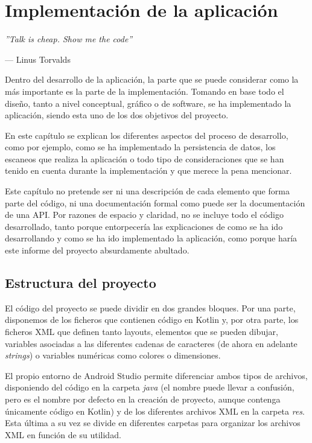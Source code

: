 \chapter{Implementación de la aplicación}

\epigraph{\textit{''Talk is cheap. Show me the code''}}{--- Linus Torvalds}

Dentro del desarrollo de la aplicación, la parte que se puede considerar como la más importante es la parte de la implementación. Tomando en base todo el diseño, tanto a nivel conceptual, gráfico o de software, se ha implementado la aplicación, siendo esta uno de los dos objetivos del proyecto.

En este capítulo se explican los diferentes aspectos del proceso de desarrollo, como por ejemplo, como se ha implementado la persistencia de datos, los escaneos que realiza la aplicación o todo tipo de consideraciones que se han tenido en cuenta durante la implementación y que merece la pena mencionar.

Este capítulo no pretende ser ni una descripción de cada elemento que forma parte del código, ni una documentación formal como puede ser la documentación de una API. Por razones de espacio y claridad, no se incluye todo el código desarrollado, tanto porque entorpecería las explicaciones de como se ha ido desarrollando y como se ha ido implementado la aplicación, como porque haría este informe del proyecto absurdamente abultado.

\section{Estructura del proyecto}
El código del proyecto se puede dividir en dos grandes bloques. Por una parte, disponemos de los ficheros que contienen código en Kotlin y, por otra parte, los ficheros XML que definen tanto layouts, elementos que se pueden dibujar, variables asociadas a las diferentes cadenas de caracteres (de ahora en adelante \textit{strings}) o variables numéricas como colores o dimensiones.

El propio entorno de Android Studio permite diferenciar ambos tipos de archivos, disponiendo del código en la carpeta \textit{java} (el nombre puede llevar a confusión, pero es el nombre por defecto en la creación de proyecto, aunque contenga únicamente código en Kotlin) y de los diferentes archivos XML en la carpeta \textit{res}. Esta última a su vez se divide en diferentes carpetas para organizar los archivos XML en función de su utilidad.

